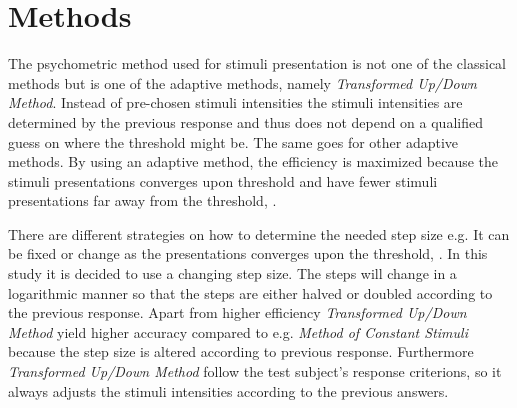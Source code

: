 \section*{Methods}
\label{Methods}
%
The psychometric method used for stimuli presentation is not one of the classical methods but is one of the adaptive methods, namely \textit{Transformed Up/Down Method}. Instead of pre-chosen stimuli intensities the stimuli intensities are determined by the previous response and thus does not depend on a qualified guess on where the threshold might be. The same goes for other adaptive methods. By using an adaptive method, the efficiency is maximized because the stimuli presentations converges upon threshold and have fewer stimuli presentations far away from the threshold, \parencite[p. 287]{PDF:Hearing}. 

There are different strategies on how to determine the needed step size e.g. It can be fixed or change as the presentations converges upon the threshold, \parencite[p. 22]{PDF:Psychoacoustic}. In this study it is decided to use a changing step size. The steps will change in a logarithmic manner so that the steps are either halved or doubled according to the previous response. Apart from higher efficiency \textit{Transformed Up/Down Method} yield higher accuracy compared to e.g. \textit{Method of Constant Stimuli} because the step size is altered according to previous response. Furthermore \textit{Transformed Up/Down Method} follow the test subject's response criterions, so it always adjusts the stimuli intensities according to the previous answers.  

